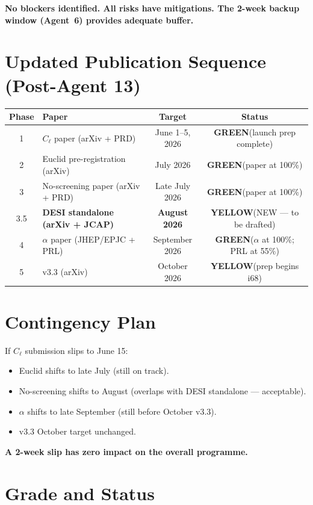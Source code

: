 \documentclass[11pt,a4paper]{article}
\newcommand{\GREEN}{\textcolor{dfdgreen}{\textbf{GREEN}}}
\newcommand{\YELLOW}{\textcolor{dfdyellow}{\textbf{YELLOW}}}
\begin{document}
\textbf{No blockers identified. All risks have mitigations. The 2-week backup window (Agent~6) provides adequate buffer.}

\section{Updated Publication Sequence (Post-Agent 13)}

\begin{center}
\begin{tabular}{clcc}
\toprule
\textbf{Phase} & \textbf{Paper} & \textbf{Target} & \textbf{Status} \\
\midrule
1 & $C_\ell$ paper (arXiv + PRD) & June 1--5, 2026 & \GREEN (launch prep complete) \\
2 & Euclid pre-registration (arXiv) & July 2026 & \GREEN (paper at 100\%) \\
3 & No-screening paper (arXiv + PRD) & Late July 2026 & \GREEN (paper at 100\%) \\
3.5 & \textbf{DESI standalone (arXiv + JCAP)} & \textbf{August 2026} & \YELLOW (NEW --- to be drafted) \\
4 & $\alpha$ paper (JHEP/EPJC + PRL) & September 2026 & \GREEN ($\alpha$ at 100\%; PRL at 55\%) \\
5 & v3.3 (arXiv) & October 2026 & \YELLOW (prep begins i68) \\
\bottomrule
\end{tabular}
\end{center}

\section{Contingency Plan}

If $C_\ell$ submission slips to June 15:
\begin{itemize}
\item Euclid shifts to late July (still on track).
\item No-screening shifts to August (overlaps with DESI standalone --- acceptable).
\item $\alpha$ shifts to late September (still before October v3.3).
\item v3.3 October target unchanged.
\end{itemize}

\textbf{A 2-week slip has zero impact on the overall programme.}

\section{Grade and Status}
\end{document}
